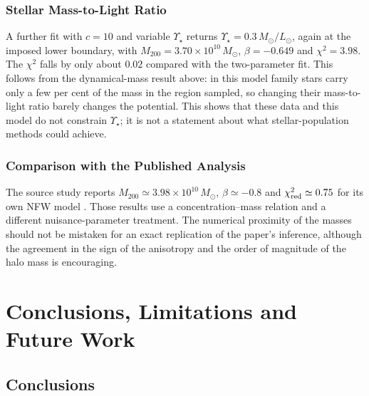 \documentclass[12pt,a4paper]{report}
\numberwithin{equation}{chapter}
\begin{document}
\subsection*{Stellar Mass-to-Light Ratio}

A further fit with $c=10$ and variable $\Upsilon_\star$ returns $\Upsilon_\star=0.3\,M_\odot/L_\odot$, again at the imposed lower boundary, with $M_{200}=3.70\times10^{10}\,M_\odot$, $\beta=-0.649$ and $\chi^2=3.98$. The $\chi^2$ falls by only about $0.02$ compared with the two-parameter fit. This follows from the dynamical-mass result above: in this model family stars carry only a few per cent of the mass in the region sampled, so changing their mass-to-light ratio barely changes the potential. This shows that these data and this model do not constrain $\Upsilon_\star$; it is not a statement about what stellar-population methods could achieve.

\subsection*{Comparison with the Published Analysis}

The source study reports $M_{200}\simeq3.98\times10^{10}\,M_\odot$, $\beta\simeq-0.8$ and $\chi^2_{\rm red}\simeq0.75$ for its own NFW model \cite{bhatia2024}. Those results use a concentration--mass relation and a different nuisance-parameter treatment. The numerical proximity of the masses should not be mistaken for an exact replication of the paper's inference, although the agreement in the sign of the anisotropy and the order of magnitude of the halo mass is encouraging.

\chapter{Conclusions, Limitations and Future Work}

\section{Conclusions}
\end{document}
